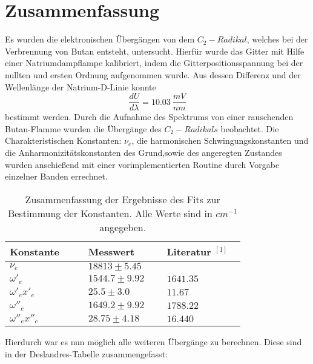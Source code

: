 %

 
%
\section{Zusammenfassung}


Es wurden die elektronischen Übergängen von dem $C_2-Radikal$, welches bei der Verbrennung von Butan entsteht, untersucht. Hierfür wurde das Gitter mit Hilfe einer Natriumdampflampe kalibriert, indem die Gitterpositionsspannung bei der nullten und ersten Ordnung aufgenommen wurde. Aus dessen Differenz und der Wellenlänge der Natrium-D-Linie konnte 
\begin{equation}
\frac{dU}{d\lambda}=10.03~\si{\frac{mV}{nm}}
\end{equation}
bestimmt werden. Durch die Aufnahme des Spektrums von einer rauschenden Butan-Flamme wurden die Übergänge des $C_2-Radikals$ beobachtet. Die Charakteristischen  Konstanten: $\nu_e$, die harmonischen Schwingungskonstanten und die Anharmonizitätskonstanten des Grund,sowie des angeregten Zustandes wurden anschießend mit einer vorimplementierten Routine durch Vorgabe einzelner Banden errechnet.


\begin{table}[H]

 
 \caption{Zusammenfassung der Ergebnisse des Fits zur Bestimmung der Konstanten. Alle Werte sind in $\si{cm}^{-1}$ angegeben.}
\begin{tabular}{C{0.3\linewidth}|C{0.3\linewidth}C{0.3\linewidth}}

 
 Konstante &  Messwert &  Literatur $^{[1]}$\\
  \hline \addlinespace[1ex] 
$\nu_e$ & $18813 \pm 5.45$ & \\
$\omega'_e$ & $1544.7 \pm9.92$ & $1641.35$ \\
$\omega'_e x'_e$ & $25.5 \pm 3.0$ &  $11.67$ \\
$\omega''_e$ & $1649.2 \pm 9.92$ & $1788.22$ \\
$\omega''_e x''_e$ & $28.75 \pm 4.18$ & $16.440$ \\
 
   
 \end{tabular}
 \label{tab1}
 \end{table}

Hierdurch war es nun möglich alle weiteren Übergänge zu berechnen. Diese sind in der Deslandres-Tabelle zusammengefasst:

